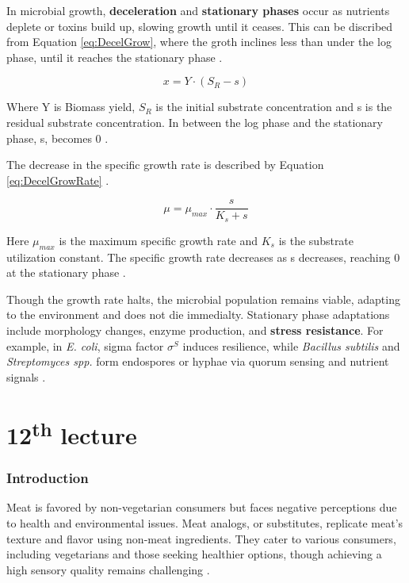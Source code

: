 In microbial growth, \textbf{deceleration} and \textbf{stationary phases} occur as nutrients deplete or toxins build up, slowing growth until it ceases. This can be discribed from Equation \ref*{eq:DecelGrow}, where the groth inclines less than under the log phase, until it reaches the stationary phase \cite*{L11-MicroGrow}.

\begin{equation}
    x = Y \cdot (S_R-s)
    \label{eq:DecelGrow}
\end{equation}

Where Y is Biomass yield, $S_R$ is the initial substrate concentration and s is the residual substrate concentration. In between the log phase and the stationary phase, s, becomes 0 \cite*{L11-MicroGrow}. 

The decrease in the specific growth rate is described by Equation \ref*{eq:DecelGrowRate} \cite*{L11-MicroGrow}.

\begin{equation}
    \mu = \mu_{max} \cdot \frac{s}{K_s + s}
    \label{eq:DecelGrowRate}
\end{equation}

Here $\mu_{max}$ is the maximum specific growth rate and $K_s$ is the substrate utilization constant. The specific growth rate decreases as s decreases, reaching 0 at the stationary phase \cite*{L11-MicroGrow}.

Though the growth rate halts, the microbial population remains viable, adapting to the environment and does not die immedialty. Stationary phase adaptations include morphology changes, enzyme production, and \textbf{stress resistance}. For example, in \textit{E. coli}, sigma factor $\sigma^S$ induces resilience, while \textit{Bacillus subtilis} and \textit{Streptomyces spp.} form endospores or hyphae via quorum sensing and nutrient signals \cite*{L11-MicroGrow}.

\section{12\texorpdfstring{\textsuperscript{th}}{th} lecture}
\subsubsection*{Introduction}
Meat is favored by non-vegetarian consumers but faces negative perceptions due to health and environmental issues. Meat analogs, or substitutes, replicate meat's texture and flavor using non-meat ingredients. They cater to various consumers, including vegetarians and those seeking healthier options, though achieving a high sensory quality remains challenging \cite*{L12-MeatAna}.

